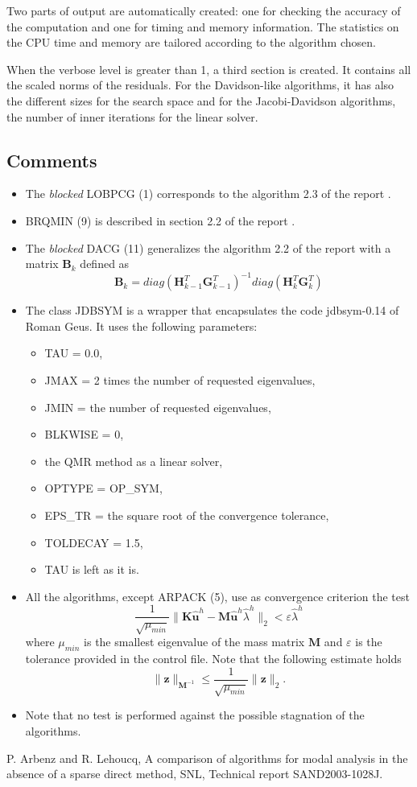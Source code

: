 \documentclass[11pt]{article}
\providecommand{\norm}[1]{\lVert#1\rVert}
\newcommand{\K}{\mathbf{K}}
\newcommand{\M}{\mathbf{M}}
\begin{document}
Two parts of output are automatically created: one for checking the accuracy of the 
computation and one for timing and memory information.
The statistics on the CPU time and memory are tailored according to the algorithm
chosen.

When the verbose level is greater than 1, a third section is created.
It contains all the scaled norms of the residuals.
For the Davidson-like algorithms, it has also the different sizes for the search space
and for the Jacobi-Davidson algorithms, the number of inner iterations for the
linear solver.

\subsection{Comments}

\begin{itemize}
\item The {\it blocked} LOBPCG (1) corresponds to the algorithm 2.3 of the report
\cite{Arbenz:2003:CAM}.
\item BRQMIN (9) is described in section 2.2 of the report \cite{Arbenz:2003:CAM}.
\item The {\it blocked} DACG (11) generalizes the algorithm 2.2 of the report
\cite{Arbenz:2003:CAM} with a matrix $\mathbf{B}_k$ defined as
$$
\mathbf{B}_k = diag( \mathbf{H}^T_{k-1} \mathbf{G}^T_{k-1} )^{-1}
                           diag( \mathbf{H}^T_{k} \mathbf{G}^T_{k} )
$$
\item The class JDBSYM is a wrapper that encapsulates the code jdbsym-0.14 of
Roman Geus. It uses the following parameters:
        \begin{itemize}
        \item TAU = 0.0,
        \item JMAX = 2 times the number of requested eigenvalues,
        \item JMIN = the number of requested eigenvalues,
        \item BLKWISE = 0,
        \item the QMR method as a linear solver,
        \item OPTYPE = OP\_SYM,
        \item EPS\_TR = the square root of the convergence tolerance,
        \item TOLDECAY = 1.5,
        \item TAU is left as it is.
        \end{itemize}\item All the algorithms, except ARPACK (5), use as convergence criterion the test
$$
\frac{1}{ \sqrt{\mu_{min}} } 
\norm{ \K \mathbf{ \hat{u} }^h - \M \mathbf{ \hat{u} }^h \hat{\lambda}^h }_{2} 
< \varepsilon \hat{\lambda}^h
$$
where $\mu_{min}$ is the smallest eigenvalue of the mass matrix $\M$ and 
$\varepsilon$ is the tolerance provided in the control file.
Note that the following estimate holds
$$
\norm{ \mathbf{z} }_{\M^{-1}} \leq \frac{1}{ \sqrt{\mu_{min}} } \norm{ \mathbf{z} }_{2}.
$$
\item Note that no test is performed against the possible stagnation of the algorithms.
\end{itemize}

\begin{thebibliography}{99}
P. Arbenz and R. Lehoucq, 
A comparison of algorithms for modal analysis in the absence of a sparse direct method,
SNL, Technical report SAND2003-1028J.
\end{thebibliography}
\end{document}
